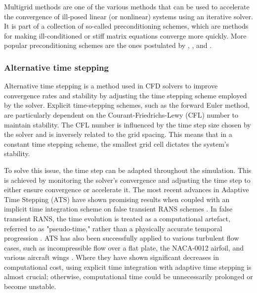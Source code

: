 Multigrid methods are one of the various methods that can be used to accelerate the convergence of ill-posed linear (or nonlinear) systems using an iterative solver. It is part of a collection of so-called preconditioning schemes, which are methods for making ill-conditioned or stiff matrix equations converge more quickly. More popular preconditioning schemes are the ones postulated by \textcite{Turkel1999}, \textcite{Weiss1994}, \textcite{Meijerink1977} and \textcite{Chapman2000}.

\subsubsection{Alternative time stepping}
Alternative time stepping is a method used in CFD solvers to improve convergence rates and stability by adjusting the time stepping scheme employed by the solver. Explicit time-stepping schemes, such as the forward Euler method, are particularly dependent on the Courant-Friedrichs-Lewy (CFL) number to maintain stability. The CFL number is influenced by the time step size chosen by the solver and is inversely related to the grid spacing. This means that in a constant time stepping scheme, the smallest grid cell dictates the system's stability.

To solve this issue, the time step can be adapted throughout the simulation. This is achieved by monitoring the solver's convergence and adjusting the time step to either ensure convergence or accelerate it. The most recent advances in Adaptive Time Stepping (ATS) have shown promising results when coupled with an implicit time integration scheme on false transient RANS schemes \cite{Nived2025}. In false transient RANS, the time evolution is treated as a computational artefact, referred to as "pseudo-time," rather than a physically accurate temporal progression \cite{Nived2025}. ATS has also been successfully applied to various turbulent flow cases, such as incompressible flow over a flat plate, the NACA-0012 airfoil, and various aircraft wings \cite{Nived2025}. Where they have shown significant decreases in computational cost, using explicit time integration with adaptive time stepping is almost crucial; otherwise, computational time could be unnecessarily prolonged or become unstable. 

